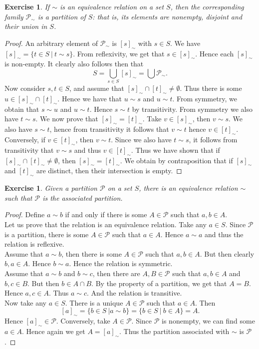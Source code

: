 \documentclass[a4paper, 11pt]{book}
\theoremstyle{plain}
\newtheorem{exercise}[theorem]{Exercise}
\theoremstyle{plain}
\begin{document}
\begin{exercise}
If $\sim$ is an equivalence relation on a set $S$, then the corresponding family $\mathcal{P}_\sim$ is a partition of $S$: that is, its elements are nonempty, disjoint and their union in $S$.  
\end{exercise}
 \begin{proof}
 An arbitrary element of $\mathcal{P}_\sim$ is $[s]_\sim$ with $s\in S$. We have $[s]_\sim =\{t\in S~\vert~t\sim s\}$. From reflexivity, we get that $s\in [s]_\sim$. Hence each $[s]_\sim$ is non-empty. It clearly also follows then that
$$S = \bigcup_{s\in S}[s]_\sim = \bigcup\mathcal{P}_\sim.$$
Now consider $s,t\in S$, and assume that $[s]_\sim\cap [t]_\sim \neq \emptyset$. Thus there is some $u\in [s]_\sim \cap [t]_\sim$. Hence we have that $u\sim s$ and $u\sim t$. From symmetry, we obtain that $s\sim u$ and $u\sim t$. Hence $s \sim t$ by transitivity. From symmetry we also have $t\sim s$. We now prove that $[s]_\sim = [t]_\sim$. Take $v\in [s]_\sim$, then $v\sim s$. We also have $s\sim t$, hence from transitivity it follows that $v\sim t$ hence $v\in [t]_\sim$. Conversely, if $v\in [t]_\sim$, then $v\sim t$. Since we also have $t\sim s$, it follows from transitivity that $v\sim s$ and thus $v\in [t]_\sim$. Thus we have shown that if $[s]_\sim\cap [t]_\sim\neq \emptyset$, then $[s]_\sim = [t]_\sim$. We obtain by contraposition that if $[s]_\sim$ and $[t]_\sim$ are distinct, then their intersection is empty.
 \end{proof}
 \begin{exercise}
 Given a partition $\mathcal{P}$ on a set $S$, there is an equivalence relation $\sim$ such that $\mathcal{P}$ is the associated partition.
\end{exercise}
\begin{proof}
Define $a\sim b$ if and only if  there is some $A\in \mathcal{P}$ such that $a,b\in A$. \\
Let us prove that the relation is an equivalence relation. Take any $a\in S$. Since $\mathcal{P}$ is a partition, there is some $A\in \mathcal{P}$ such that $a\in A$. Hence $a\sim a$ and thus the relation is reflexive.\\
Assume that $a\sim b$, then there is some $A\in \mathcal{P}$ such that $a,b\in A$. But then clearly $b,a\in A$. Hence $b\sim a$. Hence the relation is symmetric.\\
Assume that $a\sim b$ and $b\sim c$, then there are $A,B\in \mathcal{P}$ such that $a,b\in A$ and $b,c\in B$. But then $b\in A\cap B$. By the property of a partition, we get that $A=B$. Hence $a,c\in A$. Thus $a\sim c$. And the relation is transitive.\\
Now take any $a\in S$. There is a unique $A\in \mathcal{P}$ such that $a\in A$. Then
$$[a]_\sim = \{b\in S~\vert a\sim b\} = \{b\in S~\vert~b\in A\} = A.$$
Hence $[a]_\sim\in \mathcal{P}$. Conversely, take $A\in \mathcal{P}$. Since $\mathcal{P}$ is nonempty, we can find some $a\in A$. Hence again we get $A = [a]_\sim$. Thus the partition associated with $\sim$ is $\mathcal{P}$.
\end{proof}
\end{document}
